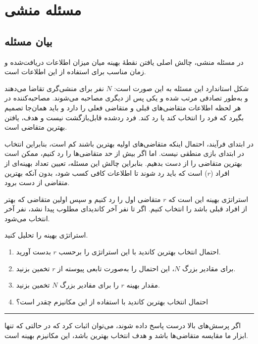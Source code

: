 \documentclass[a4paper]{article}
\begin{document}
\section{مسئله منشی}

\subsection{بیان مسئله}

در مسئله منشی، چالش اصلی یافتن نقطهٔ بهینه میان میزان اطلاعات دریافت‌شده و زمان مناسب برای استفاده از این اطلاعات است.

شکل استاندارد این مسئله به این صورت است: $N$ نفر برای منشی‌گری تقاضا می‌دهند و به‌طور تصادفی مرتب شده و یکی پس از دیگری مصاحبه می‌شوند. مصاحبه‌کننده در هر لحظه اطلاعات متقاضی‌های قبلی و متقاضی فعلی را دارد و باید همان‌جا تصمیم بگیرد که فرد را انتخاب کند یا رد کند. فرد ردشده قابل‌بازگشت نیست و هدف، یافتن بهترین متقاضی است.

در ابتدای فرآیند، احتمال اینکه متقاضی‌های اولیه بهترین باشند کم است، بنابراین انتخاب در ابتدای بازی منطقی نیست. اما اگر بیش از حد متقاضی‌ها را رد کنیم، ممکن است بهترین متقاضی را از دست بدهیم. بنابراین چالش این مسئله، تعیین تعداد بهینه‌ای از افراد ($r$) است که باید رد شوند تا اطلاعات کافی کسب شود، بدون آنکه بهترین متقاضی از دست برود.

استراتژی بهینه این است که $r$ متقاضی اول را رد کنیم و سپس اولین متقاضی که بهتر از افراد قبلی باشد را انتخاب کنیم. اگر تا نفر آخر کاندیدای مطلوب پیدا نشد، نفر آخر انتخاب می‌شود.

\vspace{5mm}{\color{ThQColor}\hrule}
\begin{ThQuestion}
	استراتژی بهینه را تحلیل کنید.

	\begin{enumerate}
		\item احتمال انتخاب بهترین کاندید با این استراتژی را برحسب $r$ بدست آورید.
		\item برای مقادیر بزرگ $N$، این احتمال را به‌صورت تابعی پیوسته از $r$ تخمین بزنید.
		\item مقدار بهینه $r$ را برای مقادیر بزرگ $N$ تخمین بزنید.
		\item احتمال انتخاب بهترین کاندید با استفاده از این مکانیزم چقدر است؟
	\end{enumerate}
\end{ThQuestion}
{\color{ThQColor}\hrule}\vspace{5mm}

اگر پرسش‌های بالا درست پاسخ داده شوند، می‌توان اثبات کرد که در حالتی که تنها ابزار ما مقایسه متقاضی‌ها باشد و هدف انتخاب بهترین باشد، این مکانیزم بهینه است.
\end{document}

